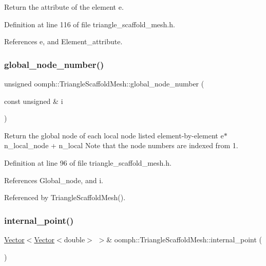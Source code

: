 Return the attribute of the element e. 



Definition at line 116 of file triangle\+\_\+scaffold\+\_\+mesh.\+h.



References e, and Element\+\_\+attribute.

\mbox{\label{classoomph_1_1TriangleScaffoldMesh_a1083e791f7a2c839e93f5ec9cce28b9b}} 
\subsubsection{\texorpdfstring{global\+\_\+node\+\_\+number()}{global\_node\_number()}}
{\footnotesize\ttfamily unsigned oomph\+::\+Triangle\+Scaffold\+Mesh\+::global\+\_\+node\+\_\+number (\begin{DoxyParamCaption}\item[{const unsigned \&}]{i }\end{DoxyParamCaption})\hspace{0.3cm}{\ttfamily [inline]}}



Return the global node of each local node listed element-\/by-\/element e$\ast$n\+\_\+local\+\_\+node + n\+\_\+local Note that the node numbers are indexed from 1. 



Definition at line 96 of file triangle\+\_\+scaffold\+\_\+mesh.\+h.



References Global\+\_\+node, and i.



Referenced by Triangle\+Scaffold\+Mesh().

\mbox{\label{classoomph_1_1TriangleScaffoldMesh_a6323e0c376f978c899c3a8c5f36be7b8}} 
\subsubsection{\texorpdfstring{internal\+\_\+point()}{internal\_point()}}
{\footnotesize\ttfamily \hyperlink{classoomph_1_1Vector}{Vector}$<$\hyperlink{classoomph_1_1Vector}{Vector}$<$double$>$ $>$\& oomph\+::\+Triangle\+Scaffold\+Mesh\+::internal\+\_\+point (\begin{DoxyParamCaption}{ }\end{DoxyParamCaption})\hspace{0.3cm}{\ttfamily [inline]}}



